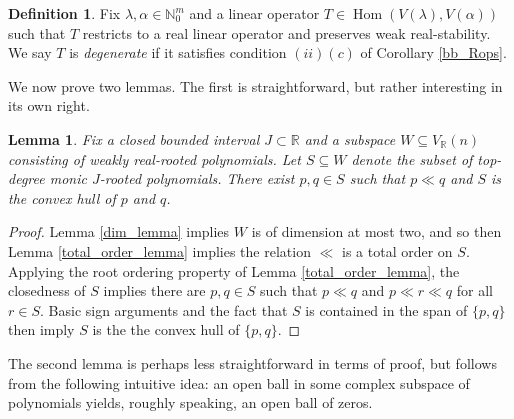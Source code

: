 \documentclass{article}
\newtheorem{lemma}[theorem]{Lemma}
\theoremstyle{definition}
\newtheorem{definition}[theorem]{Definition}
\theoremstyle{plain}
\newcommand{\R}{\mathbb{R}}
\newcommand{\N}{\mathbb{N}}
\DeclareMathOperator{\Hom}{Hom}
\begin{document}
\begin{definition}
    Fix $\lambda,\alpha \in \N_0^m$ and a linear operator $T \in \Hom(V(\lambda),V(\alpha))$ such that $T$ restricts to a real linear operator and preserves weak real-stability. We say $T$ is \emph{degenerate} if it satisfies condition $(ii)(c)$ of Corollary \ref{bb_Rops}.
\end{definition}

We now prove two lemmas. The first is straightforward, but rather interesting in its own right.

\begin{lemma}\label{conv_lemma}
    Fix a closed bounded interval $J \subset \R$ and a subspace $W \subseteq V_\R(n)$ consisting of weakly real-rooted polynomials. Let $S \subseteq W$ denote the subset of top-degree monic $J$-rooted polynomials. There exist $p,q \in S$ such that $p \ll q$ and $S$ is the convex hull of $p$ and $q$.
\end{lemma}
\begin{proof}
    Lemma \ref{dim_lemma} implies $W$ is of dimension at most two, and so then Lemma \ref{total_order_lemma} implies the relation $\ll$ is a total order on $S$. Applying the root ordering property of Lemma \ref{total_order_lemma}, the closedness of $S$ implies there are $p,q \in S$ such that $p \ll q$ and $p \ll r \ll q$ for all $r \in S$. Basic sign arguments and the fact that $S$ is contained in the span of $\{p,q\}$ then imply $S$ is the the convex hull of $\{p,q\}$.
\end{proof}

The second lemma is perhaps less straightforward in terms of proof, but follows from the following intuitive idea: an open ball in some complex subspace of polynomials yields, roughly speaking, an open ball of zeros.
\end{document}
